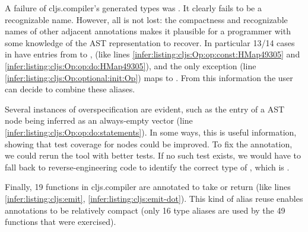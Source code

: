 A failure of cljs.compiler's
generated types was .
It clearly fails to be a recognizable name.
However, all is not lost:
the compactness and recognizable names of other adjacent annotations
makes it plausible for a programmer with some
knowledge of the AST representation to 
recover.
In particular 13/14 cases in 
have entries from  to , 
(like lines \ref{infer:listing:cljs:Op:op:const:HMap49305} and \ref{infer:listing:cljs:Op:op:do:HMap49305}),
and the only exception (line \ref{infer:listing:cljs:Op:optional:init:Op})
maps to . From this information the user can
decide to combine these aliases.

Several instances of overspecification are evident,
such as the  entry of a  AST node being inferred as an always-empty vector
(line \ref{infer:listing:cljs:Op:op:do:statements}).
In some ways, this is useful information, showing that
test coverage for  nodes could be improved.
To fix the annotation, we could rerun the tool with better tests.
If no such test exists, we would have to fall back
to reverse-engineering code to identify the correct
type of , which is .

Finally, 19 functions in cljs.compiler are annotated to 
take or return  (like lines \ref{infer:listing:cljs:emit}, \ref{infer:listing:cljs:emit-dot}).
This kind of alias reuse enables annotations
to be relatively compact (only 16 type aliases are used by the
49 functions that were exercised).

%
%
%
%
%
%


